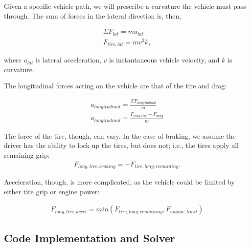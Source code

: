\documentclass{article}
\begin{document}
Given a specific vehicle path, we will prescribe a curvature the vehicle must pass through. The sum of forces in the lateral direction is, then,

\begin{align}
    \Sigma F_{lat} = m a_{lat} \\
    F_{tire,lat} = m v^2 k, \label{eq_lateral}
\end{align}

where $a_{lat}$ is lateral acceleration, $v$ is instantaneous vehicle velocity, and $k$ is curvature.


%

The longitudinal forces acting on the vehicle are that of the tire and drag:

\begin{align}
    a_{longitudinal} = \frac{\Sigma F_{longitudinal}}{m}\\
    a_{longitudinal} = \frac{F_{long,tire} - F_{drag} }{m} \label{eq_accel}
\end{align}

The force of the tire, though, can vary. In the case of braking, we assume the driver has the ability to lock up the tires, but does not; i.e., the tires apply all remaining grip: 
\begin{align}
F_{long,tire,braking} = -F_{tire,long,remaining}. \label{eq_accel_brake}
\end{align}

Acceleration, though, is more complicated, as the vehicle could be limited by either tire grip or engine power:

\begin{align}
	F_{long,tire,accel} = min(F_{tire,long,remaining}, F_{engine,limit})
\end{align}

\subsection{Code Implementation and Solver}
\end{document}
